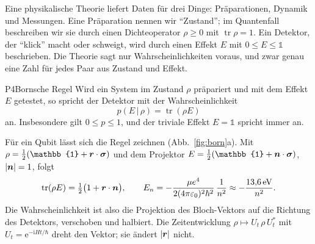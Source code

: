 

Eine physikalische Theorie liefert Daten für drei Dinge: Präparationen, Dynamik und Messungen.
Eine Präparation nennen wir \enquote{Zustand}; im Quantenfall beschreiben wir sie durch einen
Dichteoperator $\rho\geq 0$ mit $\operatorname{tr}\rho=1$.
Ein Detektor, der \enquote{klick} macht oder schweigt, wird durch einen Effekt $E$ mit
$0\leq E\leq\mathbb{1}$ beschrieben. Die Theorie sagt nur Wahrscheinlichkeiten voraus, und zwar
genau eine Zahl für jedes Paar aus Zustand und Effekt.

\begin{pkgpostulate}{P4}{Bornsche Regel}
Wird ein System im Zustand $\rho$ präpariert und mit dem Effekt $E$ getestet, so spricht der
Detektor mit der Wahrscheinlichkeit
\begin{equation}
  p(E\,\vert\,\rho)=\operatorname{tr}(\rho E)
\end{equation}
an. Insbesondere gilt $0\leq p\leq 1$, und der triviale Effekt $E=\mathbb{1}$ spricht immer an.
\end{pkgpostulate}

Für ein Qubit lässt sich die Regel zeichnen (Abb.~\ref{fig:born}a). Mit
$\rho=\tfrac12{(\mathbb{1}+\pkgvec{r}\cdot\pkgvec{\sigma})}$ und dem Projektor
$E=\tfrac12{(\mathbb{1}+\pkgvec{n}\cdot\pkgvec{\sigma})}$, $\lvert\boldsymbol{n}\rvert=1$, folgt
\begin{equation}
  \operatorname{tr}(\rho E)=\tfrac12\bigl(1+\boldsymbol{r}\cdot\boldsymbol{n}\bigr),
  \qquad
  E_n=-\frac{\mu e^4}{2(4\pi\varepsilon_0)^2\hbar^2}\,\frac{1}{n^2}\approx-\frac{\qty{13.6}{\electronvolt}}{n^2}.
\end{equation}
Die Wahrscheinlichkeit ist also die Projektion des Bloch-Vektors auf die Richtung des
Detektors, verschoben und halbiert. Die Zeitentwicklung $\rho\mapsto U_t\,\rho\,U_t^{*}$ mit
$U_t=\mathrm{e}^{-\mathrm{i}Ht/\hbar}$ dreht den Vektor; sie ändert $\lvert\boldsymbol{r}\rvert$ nicht.


